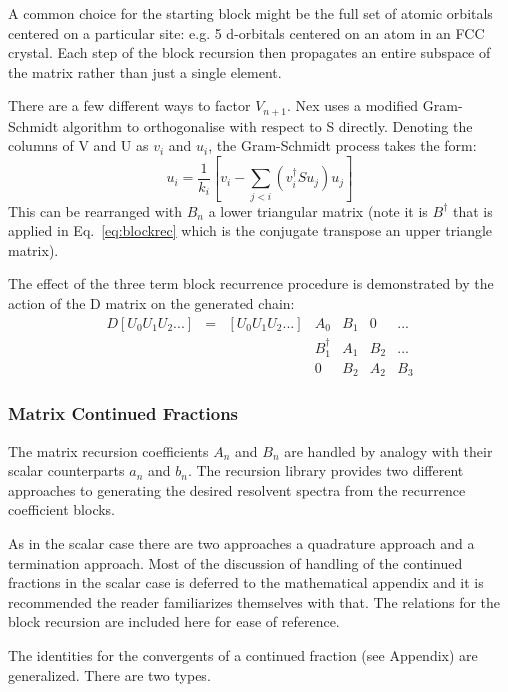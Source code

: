 A common choice for the starting block
might be the full set of atomic orbitals centered on a particular 
site: e.g. 5 d-orbitals centered on an atom in an FCC crystal. 
Each step of the block recursion then propagates an entire subspace of
the matrix rather than just a single element.

There are a few different ways to factor $V_{n+1}$. Nex
uses a modified Gram-Schmidt algorithm to orthogonalise 
with respect to S directly. Denoting the columns of V and U
as $v_{i}$ and $u_{i}$, the Gram-Schmidt process takes the
form:
%
\begin{equation}
u_{i} = \frac{1}{k_{i}}[v_{i} - \sum_{j < i} (v^{\dagger}_{i}Su_{j})u_{j}]
\end{equation}
%
This can be rearranged with $B_{n}$ a lower triangular matrix (note it is $B^{\dagger}$
that is applied in Eq.~\ref{eq:blockrec} which is the conjugate transpose an upper triangle
matrix).

The effect of the three term block recurrence procedure
is demonstrated by the action of the D matrix on the 
generated chain:
%
\begin{align*}
D[U_{0}U_{1}U_{2}...] &= &[U_{0}U_{1}U_{2}...]& A_{0}           & B_{1} & 0     & ...   \\
                      &  &                    & B_{1}^{\dagger} & A_{1} & B_{2} & ...   \\
                      &  &                    & 0               & B_{2} & A_{2} & B_{3}
\end{align*}
%

\subsubsection{Matrix Continued Fractions}
The matrix recursion coefficients $A_{n}$ and $B_{n}$ are handled by
analogy with their scalar counterparts $a_{n}$ and $b_{n}$. 
The recursion library provides two different approaches to generating 
the desired resolvent spectra from the recurrence coefficient blocks.

As in the scalar case there are two approaches a quadrature approach
and a termination approach. Most of the discussion 
of handling of the continued fractions in the scalar case
is deferred to the mathematical appendix and it is recommended 
the reader familiarizes themselves with that. The relations for
the block recursion are included here for ease of reference.

The identities for the convergents of a continued fraction (see Appendix)
are generalized. There are two types.

